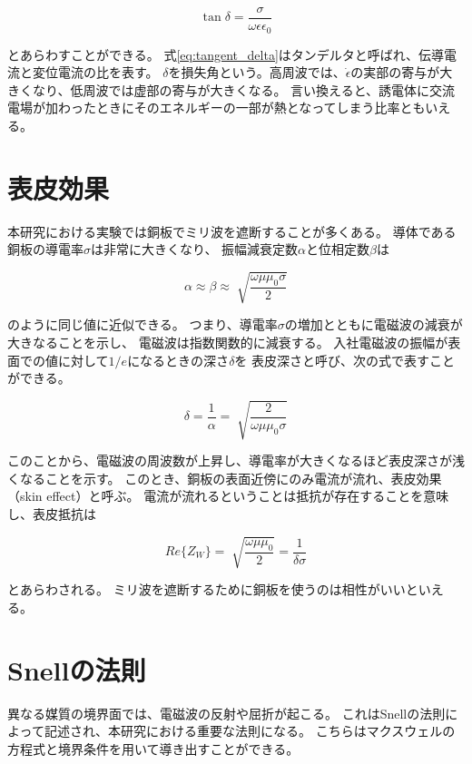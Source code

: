 \documentclass[a4paper,11pt]{jsarticle}
\begin{document}
\begin{equation} \label{eq:tangent_delta}
  \tan \delta = \frac{\sigma}{\omega\epsilon\epsilon_0}
\end{equation}

とあらわすことができる。
式\ref{eq:tangent_delta}はタンデルタと呼ばれ、伝導電流と変位電流の比を表す。
$\delta$を損失角という。高周波では、$\dot{\epsilon}$の実部の寄与が大きくなり、低周波では虚部の寄与が大きくなる。
言い換えると、誘電体に交流電場が加わったときにそのエネルギーの一部が熱となってしまう比率ともいえる。

\section{表皮効果}

本研究における実験では銅板でミリ波を遮断することが多くある。
導体である銅板の導電率$\sigma$は非常に大きくなり、
振幅減衰定数$\alpha$と位相定数$\beta$は

\begin{equation}
  \alpha \approx \beta \approx \sqrt[]{\frac{\omega\mu\mu_0\sigma}{2}}
\end{equation}

のように同じ値に近似できる。
つまり、導電率$\sigma$の増加とともに電磁波の減衰が大きなることを示し、
電磁波は指数関数的に減衰する。
入社電磁波の振幅が表面での値に対して$1/e$になるときの深さ$\delta$を
表皮深さと呼び、次の式で表すことができる。

\begin{equation}
  \delta = \frac{1}{\alpha} = \sqrt[]{\frac{2}{\omega\mu\mu_0\sigma}}
\end{equation}

このことから、電磁波の周波数が上昇し、導電率が大きくなるほど表皮深さが浅くなることを示す。
このとき、銅板の表面近傍にのみ電流が流れ、表皮効果（skin effect）と呼ぶ。
電流が流れるということは抵抗が存在することを意味し、表皮抵抗は

\begin{equation}
  Re\{Z_W\} = \sqrt[]{\frac{\omega\mu\mu_0}{2}} = \frac{1}{\delta\sigma}
\end{equation}

とあらわされる。
ミリ波を遮断するために銅板を使うのは相性がいいといえる。

\section{Snellの法則}

異なる媒質の境界面では、電磁波の反射や屈折が起こる。
これはSnellの法則によって記述され、本研究における重要な法則になる。
こちらはマクスウェルの方程式と境界条件を用いて導き出すことができる。
\end{document}
